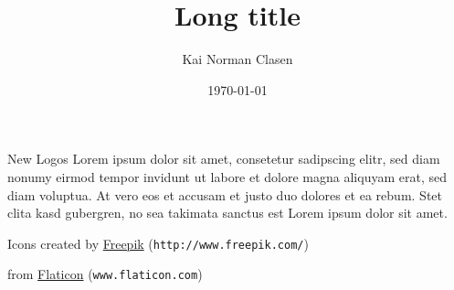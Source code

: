 \documentclass[aspectratio=169]{beamer}
\title[New Logo]{Long title}
\author{Kai Norman Clasen}
\institute{}
\date{\today}
\begin{document}
  \begin{frame}{New Logos}
    Lorem ipsum dolor sit amet, consetetur sadipscing elitr, 
    sed diam nonumy eirmod tempor invidunt ut labore et dolore 
    magna aliquyam erat, sed diam voluptua. 
    At vero eos et accusam et justo duo dolores et ea rebum. 
    Stet clita kasd gubergren, no sea takimata sanctus est 
    Lorem ipsum dolor sit amet. 

    \vfill
    Icons created by \href{http://www.freepik.com/}{Freepik}
    (\texttt{http://www.freepik.com/}) 
    
    from \href{www.flaticon.com}{Flaticon} (\texttt{www.flaticon.com})
  \end{frame}
\end{document}
